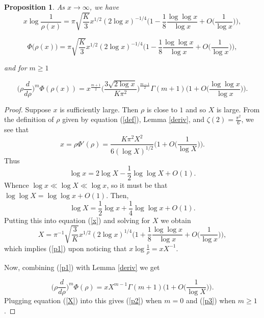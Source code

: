 \documentclass[12pt,reqno]{amsart}
\newtheorem{prop}[theorem]{Proposition}
\begin{document}
\begin{prop}\label{p}
As $x\to \infty$, we have
    \begin{equation} \label{p1}
        x \log \frac{1}{\rho(x)}=\pi\sqrt{\frac{K}{3}} x^{1/2}(2\log x)^{-1/4}\Big(1-\frac{1}{8}\frac{\log \log x}{\log x}+O\big(\frac{1}{\log x}\big)\Big),
    \end{equation}
   
    \begin{equation}\label{p2}
        \Phi\big(\rho(x)\big)=\pi\sqrt{\frac{K}{3}} x^{1/2}(2\log x)^{-1/4}\Big(1-\frac{1}{8}\frac{\log \log x}{\log x}+O\big(\frac{1}{\log x}\big)\Big),
    \end{equation}
    
    and for $m\geq 1$
    
    \begin{equation}\label{p3}
        \Big(\rho \frac{d}{d\rho}\Big)^m \Phi(\rho(x))=x^{\frac{m+1}{2}}\Bigg(\frac{3\sqrt{2 \log x}}{K\pi^2}\Bigg)^{\frac{m-1}{2}}\Gamma(m+1) \Bigg(1+O\Big(\frac{\log \log x}{\log x}\Big)\Bigg).
    \end{equation}
\end{prop}

\begin{proof}
    Suppose $x$ is sufficiently large. Then $\rho$ is close to $1$ and so $X$ is large. From the definition of $\rho$ given by equation (\ref{def}), Lemma \ref{deriv}, and  $\zeta(2)=\frac{\pi^2}{6}$, we see that
    \begin{equation}\label{x}
        x=\rho\Phi'(\rho)=\frac{K\pi^2X^2}{6(\log X)^{1/2}}\Big(1+O\Big(\frac{1}{\log X}\Big)\Big).
    \end{equation}
    Thus $$\log x=2\log X-\frac{1}{2}\log \log X+O(1).$$
    Whence $\log x\ll \log X\ll \log x$, so it must be  that $\log \log X=\log \log x+O(1)$. Then,
    $$\log X=\frac{1}{2}\log x+\frac{1}{4}\log \log x +O(1).$$
    Putting this into equation (\ref{x}) and solving for $X$ we obtain
    \begin{equation}\label{X}
        X=\pi^{-1}\sqrt{\frac{3}{K}}x^{1/2}(2\log x)^{1/4}\Big(1+\frac{1}{8}\frac{\log \log x}{\log x}+O\big(\frac{1}{\log x}\big)\Big),
    \end{equation}
    which implies (\ref{p1}) upon noticing that $ x\log \frac{1}{\rho}=xX^{-1}$.

    Now, combining (\ref{p1}) with Lemma \ref{deriv} we get

    \begin{equation*}
        \Big(\rho \frac{d}{d\rho}\Big)^m \Phi(\rho)=xX^{m-1}\Gamma(m+1)\Big(1+O\Big(\frac{1}{\log X}\Big)\Big).
    \end{equation*}
    Plugging equation (\ref{X}) into this gives (\ref{p2}) when $m=0$ and (\ref{p3}) when $m\geq 1$.

\end{proof}
\end{document}
